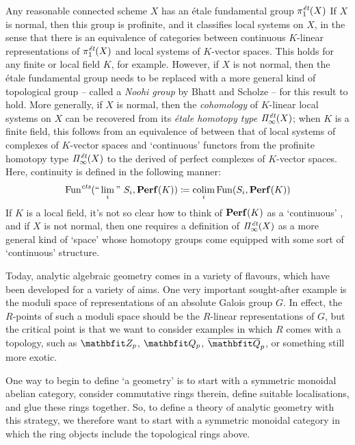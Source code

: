 \begin{exm*}
	Any reasonable connected scheme $ X $ has an étale fundamental group $ \pi_1^{\et}(X) $ 
	If $ X $ is normal, then this group is profinite, and it classifies local systems on $ X $, in the sense that there is an equivalence of categories between continuous $K$-linear representations of $ \pi_1^{\et}(X) $ and local systems of $ K $-vector spaces.
	This holds for any finite or local field $ K $, for example.
	However, if $ X $ is not normal, then the étale fundamental group needs to be replaced with a more general kind of topological group -- called a \emph{Noohi group} by Bhatt and Scholze -- for this result to hold.
	More generally, if $ X $ is normal, then the \emph{cohomology} of $ K $-linear local systems on $ X $ can be recovered from its \emph{étale homotopy type} $ \Pi_{\infty}^{\et}(X) $;
	when $ K $ is a finite field, this follows from an equivalence of \categories between that of local systems of complexes of $ K $-vector spaces and `continuous' functors from the profinite homotopy type $ \Pi_{\infty}^{\et}(X) $ to the derived \category of perfect complexes of $ K $-vector spaces.
	Here, continuity is defined in the following manner:
	\[
		\Functs( \text{``}\lim_i\text{''}\ S_i, \Dperf(K)) \coloneq \colim_i \Fun ( S_i, \Dperf(K))
	\]
	If $ K $ is a local field, it's not so clear how to think of $ \Dperf(K) $ as a `continuous' \category, and if $ X $ is not normal, then one requires a definition of $ \Pi_{\infty}^{\et}(X) $ as a more general kind of `space' whose homotopy groups come equipped with some sort of `continuous' structure.
\end{exm*}

\begin{exm*}
	Today, analytic algebraic geometry comes in a variety of flavours, which have been developed for a variety of aims.
	One very important sought-after example is the moduli space of representations of an absolute Galois group $ G $.
	In effect, the $ R $-points of such a moduli space should be the $ R $-linear representations of $ G $, but the critical point is that we want to consider examples in which $ R $ comes with a topology, such as $ \ZZ_p $, $ \QQ_p $, $ \overline{\QQ}_p $, or something still more exotic.

	One way to begin to define `a geometry' is to start with a symmetric monoidal abelian category, consider commutative rings therein, define suitable localisations, and glue these rings together.
	So, to define a theory of analytic geometry with this strategy, we therefore want to start with a symmetric monoidal category in which the ring objects include the topological rings above.
\end{exm*}

